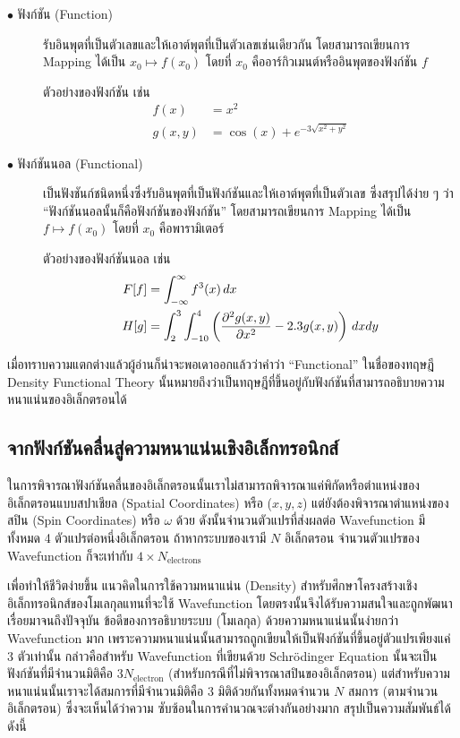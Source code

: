 \begin{description}
    \item[$\bullet$ ฟังก์ชัน (Function)] รับอินพุตที่เป็นตัวเลขและให้เอาต์พุตที่เป็นตัวเลขเช่นเดียวกัน โดยสามารถเขียนการ Mapping 
    ได้เป็น $x_0 \mapsto f(x_0)$ โดยที่ $x_{0}$ คืออาร์กิวเมนต์หรืออินพุตของฟังก์ชัน $f$ 
    
    ตัวอย่างของฟังก์ชัน เช่น
    \begin{align*}
        f(x) &= x^{2} \\
        g(x,y) &= \cos(x) + e^{-3\sqrt{x^{2} + y^{2}}}
    \end{align*}

    \item[$\bullet$ ฟังก์ชันนอล (Functional)] เป็นฟังชันก์ชนิดหนึ่งซึ่งรับอินพุตที่เป็นฟังก์ชันและให้เอาต์พุตที่เป็นตัวเลข ซึ่งสรุปได้ง่าย ๆ 
    ว่า \enquote{ฟังก์ชันนอลนั้นก็คือฟังก์ชันของฟังก์ชัน} โดยสามารถเขียนการ Mapping ได้เป็น $f \mapsto f(x_0)$ โดยที่ $x_{0}$ 
    คือพารามิเตอร์ 
    
    ตัวอย่างของฟังก์ชันนอล เช่น 
    \begin{align*}
        F[f] &= \int^{\infty}_{-\infty} f^{3}(x) \, dx \\
        H[g] &= \int^{3}_{2} \int^{4}_{-10} \left ( \pdv[2]{g(x,y)}{x} - 2.3 g(x,y) \right ) \, dx dy
    \end{align*}
\end{description}

เมื่อทราบความแตกต่างแล้วผู้อ่านก็น่าจะพอเดาออกแล้วว่าคำว่า \enquote{Functional} ในชื่อของทฤษฎี Density Functional Theory 
นั้นหมายถึงว่าเป็นทฤษฎีที่ขึ้นอยู่กับฟังก์ชันที่สามารถอธิบายความหนาแน่นของอิเล็กตรอนได้

\subsection{จากฟังก์ชันคลื่นสู่ความหนาแน่นเชิงอิเล็กทรอนิกส์}
\label{ssec:elec_density}

ในการพิจารณาฟังก์ชันคลื่นของอิเล็กตรอนนั้นเราไม่สามารถพิจารณาแค่พิกัดหรือตำแหน่งของอิเล็กตรอนแบบสปาเชียล (Spatial Coordinates) หรือ
($x, y, z$) แต่ยังต้องพิจารณาตำแหน่งของสปิน (Spin Coordinates) หรือ $\omega$ ด้วย ดังนั้นจำนวนตัวแปรที่ส่งผลต่อ Wavefunction 
มีทั้งหมด 4 ตัวแปรต่อหนึ่งอิเล็กตรอน ถ้าหากระบบของเรามี $N$ อิเล็กตรอน จำนวนตัวแปรของ Wavefunction ก็จะเท่ากับ $4 \times 
N_{\text{electrons}}$

เพื่อทำให้ชีวิตง่ายขึ้น แนวคิดในการใช้ความหนาแน่น (Density) สำหรับศึกษาโครงสร้างเชิงอิเล็กทรอนิกส์ของโมเลกุลแทนที่จะใช้ Wavefunction 
โดยตรงนั้นจึงได้รับความสนใจและถูกพัฒนาเรื่อยมาจนถึงปัจจุบัน ข้อดีของการอธิบายระบบ (โมเลกุล) ด้วยความหนาแน่นนั้นง่ายกว่า Wavefunction 
มาก เพราะความหนาแน่นนั้นสามารถถูกเขียนให้เป็นฟังก์ชันที่ขึ้นอยู่ตัวแปรเพียงแค่ 3 ตัวเท่านั้น กล่าวคือสำหรับ Wavefunction ที่เขียนด้วย 
Schr\"{o}dinger Equation นั้นจะเป็นฟังก์ชันที่มีจำนวนมิติคือ $3N_{\text{electron}}$ (สำหรับกรณีที่ไม่พิจารณาสปินของอิเล็กตรอน) 
แต่สำหรับความหนาแน่นนั้นเราจะได้สมการที่มีจำนวนมิติคือ 3 มิติด้วยกันทั้งหมดจำนวน $N$ สมการ (ตามจำนวนอิเล็กตรอน) ซึ่งจะเห็นได้ว่าความ%
ซับซ้อนในการคำนวณจะต่างกันอย่างมาก สรุปเป็นความสัมพันธ์ได้ดังนี้

